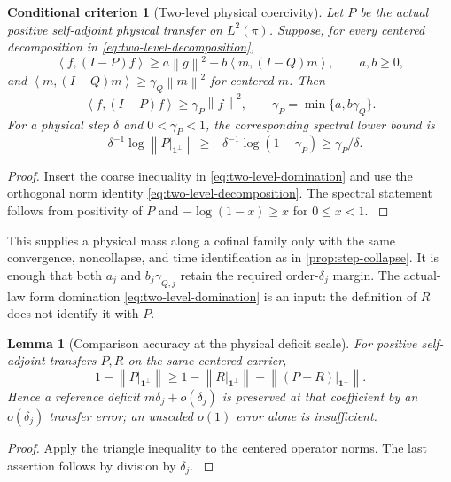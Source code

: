 \documentclass[11pt,oneside,openany]{book}
\newtheorem{lemma}[lemma]{Lemma}
\newtheorem{criterion}[criterion]{Conditional criterion}
\theoremstyle{definition}
\theoremstyle{remark}
\newcommand{\one}{\mathbf1}
\newcommand{\norm}[1]{\left\lVert#1\right\rVert}
\newcommand{\ip}[2]{\left\langle#1,#2\right\rangle}
\newcommand{\src}[2]{\cite[#2]{#1}}
\begin{document}
\begin{criterion}[Two-level physical coercivity]
\label{crit:two-level-physical}
Let $P$ be the actual positive self-adjoint physical transfer on
$L^2(\pi)$. Suppose, for every centered decomposition in
\cref{eq:two-level-decomposition},
\begin{equation}\label{eq:two-level-domination}
\ip{f}{(I-P)f}\ge
 a\norm g^2+b\ip{m}{(I-Q)m},
\qquad a,b\ge0,
\end{equation}
and $\ip{m}{(I-Q)m}\ge\gamma_Q\norm m^2$ for centered $m$.
Then
\begin{equation}\label{eq:two-level-physical-gap}
\ip{f}{(I-P)f}\ge\gamma_P\norm f^2,
\qquad \gamma_P=\min\{a,b\gamma_Q\}.
\end{equation}
For a physical step $\delta$ and $0<\gamma_P<1$, the corresponding
spectral lower bound is
\begin{equation}\label{eq:two-level-physical-mass}
-\delta^{-1}\log\norm{P|_{\one^\perp}}
\ge-\delta^{-1}\log(1-\gamma_P)
\ge\gamma_P/\delta.
\end{equation}
\end{criterion}
\begin{proof}
Insert the coarse inequality in \cref{eq:two-level-domination} and
use the orthogonal norm identity \cref{eq:two-level-decomposition}.
The spectral statement follows from positivity of $P$ and
$-\log(1-x)\ge x$ for $0\le x<1$. \src{F6}{V56}
\end{proof}

This supplies a physical mass along a cofinal family only with the
same convergence, noncollapse, and time identification as in
\cref{prop:step-collapse}. It is enough that both $a_j$ and
$b_j\gamma_{Q,j}$ retain the required order-$\delta_j$ margin.
The actual-law form domination \cref{eq:two-level-domination} is an
input: the definition of $R$ does not identify it with $P$.

\begin{lemma}[Comparison accuracy at the physical deficit scale]
\label{lem:transfer-comparison-debit}
For positive self-adjoint transfers $P,R$ on the same centered carrier,
\begin{equation}\label{eq:transfer-comparison-debit}
1-\norm{P|_{\one^\perp}}
\ge1-\norm{R|_{\one^\perp}}
  -\norm{(P-R)|_{\one^\perp}}.
\end{equation}
Hence a reference deficit $m\delta_j+o(\delta_j)$ is preserved at that
coefficient by an $o(\delta_j)$ transfer error; an unscaled $o(1)$
error alone is insufficient.
\end{lemma}
\begin{proof}
Apply the triangle inequality to the centered operator norms. The
last assertion follows by division by $\delta_j$.
\src{F6}{V56}
\end{proof}
\end{document}

